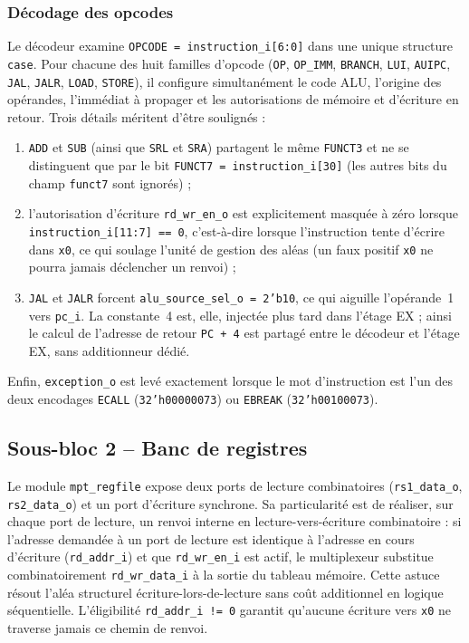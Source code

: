 \documentclass[11pt,a4paper,oneside]{report}
\begin{document}
\subsubsection*{Décodage des opcodes}
Le décodeur examine \texttt{OPCODE = instruction\_i[6:0]} dans une
unique structure \texttt{case}. Pour chacune des huit familles
d'opcode (\texttt{OP}, \texttt{OP\_IMM}, \texttt{BRANCH},
\texttt{LUI}, \texttt{AUIPC}, \texttt{JAL}, \texttt{JALR},
\texttt{LOAD}, \texttt{STORE}), il configure simultanément le code
ALU, l'origine des opérandes, l'immédiat à propager et les
autorisations de mémoire et d'écriture en retour. Trois détails
méritent d'être soulignés :
\begin{enumerate}
  \item \texttt{ADD} et \texttt{SUB} (ainsi que \texttt{SRL} et
        \texttt{SRA}) partagent le même \texttt{FUNCT3} et ne se
        distinguent que par le bit \texttt{FUNCT7 = instruction\_i[30]}
        (les autres bits du champ \texttt{funct7} sont ignorés) ;
  \item l'autorisation d'écriture \texttt{rd\_wr\_en\_o} est
        explicitement masquée à zéro lorsque
        \texttt{instruction\_i[11:7] == 0}, c'est-à-dire lorsque
        l'instruction tente d'écrire dans \texttt{x0}, ce qui
        soulage l'unité de gestion des aléas (un faux positif
        \texttt{x0} ne pourra jamais déclencher un renvoi) ;
  \item \texttt{JAL} et \texttt{JALR} forcent
        \texttt{alu\_source\_sel\_o = 2'b10}, ce qui aiguille
        l'opérande~1 vers \texttt{pc\_i}. La constante~4 est, elle,
        injectée plus tard dans l'étage EX ; ainsi le calcul de
        l'adresse de retour \texttt{PC + 4} est partagé entre le
        décodeur et l'étage EX, sans additionneur dédié.
\end{enumerate}
Enfin, \texttt{exception\_o} est levé exactement lorsque le mot
d'instruction est l'un des deux encodages \texttt{ECALL}
(\texttt{32'h00000073}) ou \texttt{EBREAK}
(\texttt{32'h00100073}).


\subsection{Sous-bloc 2 -- Banc de registres}
Le module \texttt{mpt\_regfile} expose deux ports de lecture
combinatoires (\texttt{rs1\_data\_o}, \texttt{rs2\_data\_o}) et un
port d'écriture synchrone. Sa particularité est de réaliser, sur
chaque port de lecture, un renvoi interne en lecture-vers-écriture
combinatoire : si l'adresse demandée à un port de lecture est
identique à l'adresse en cours d'écriture (\texttt{rd\_addr\_i}) et
que \texttt{rd\_wr\_en\_i} est actif, le multiplexeur substitue
combinatoirement \texttt{rd\_wr\_data\_i} à la sortie du tableau
mémoire. Cette astuce résout l'aléa structurel
\og{}écriture-lors-de-lecture\fg{} sans coût additionnel en logique
séquentielle. L'éligibilité \texttt{rd\_addr\_i != 0} garantit
qu'aucune écriture vers \texttt{x0} ne traverse jamais ce chemin
de renvoi.
\end{document}
